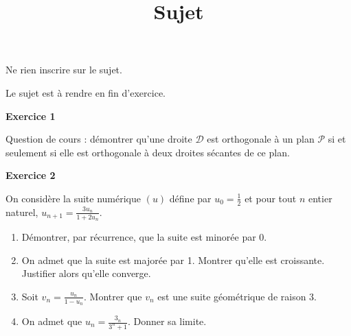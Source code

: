 \documentclass[12pt,a4paper,french]{article}
\author{}
\title{Sujet \no{11}}
\date{}
\begin{document}
\maketitle
\begin{center}Ne rien inscrire sur le sujet.

  Le sujet est à rendre en fin d'exercice.
\end{center}

\bigskip

\textbf{Exercice 1}

Question de cours : démontrer qu'une droite $\mathcal{D}$ est
orthogonale à un plan $\mathcal{P}$ si et seulement si elle est
orthogonale à deux droites sécantes de ce plan.

\medskip

\textbf{Exercice 2}

On considère la suite numérique $(u)$ défine par $u_0 = \frac12$ et pour
tout $n$ entier naturel, $u_{n+1} = \frac{3u_n}{1 + 2u_n}$.

\begin{enumerate}
  \item Démontrer, par récurrence, que la suite est minorée par 0.
  \item On admet que la suite est majorée par 1. Montrer qu'elle est
    croissante. Justifier alors qu'elle converge.
  \item Soit $v_n = \frac{u_n}{1 - u_n}$. Montrer que $v_n$ est une
    suite géométrique de raison 3.
  \item On admet que $u_n = \frac{3_n}{3^n + 1}$. Donner sa limite.
\end{enumerate}
\end{document}
